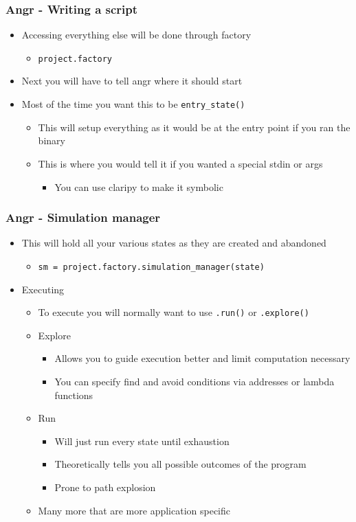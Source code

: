 \documentclass[aspectratio=169]{beamer}
\begin{document}
\begin{frame}[fragile]
\frametitle{Angr - Writing a script}
\begin{itemize}
\item Accessing everything else will be done through factory
\begin{itemize}
\item \verb|project.factory|
\end{itemize}
\item Next you will have to tell angr where it should start
\item Most of the time you want this to be \verb|entry_state()|
\begin{itemize}
\item This will setup everything as it would be at the entry point if you ran the binary
\item This is where you would tell it if you wanted a special stdin or args
\begin{itemize}
\item You can use claripy to make it symbolic
\end{itemize}
\end{itemize}
\end{itemize}
\end{frame}

\begin{frame}[fragile]
\frametitle{Angr - Simulation manager}
\begin{itemize}
\item This will hold all your various states as they are created and abandoned
\begin{itemize}
\item \verb|sm = project.factory.simulation_manager(state)|
\end{itemize}
\item Executing
\begin{itemize}
\item To execute you will normally want to use \verb|.run()| or \verb|.explore()|
\item Explore
\begin{itemize}
\item Allows you to guide execution better and limit computation necessary
\item You can specify find and avoid conditions via addresses or lambda functions
\end{itemize}
\item Run
\begin{itemize}
\item Will just run every state until exhaustion
\item Theoretically tells you all possible outcomes of the program
\item Prone to path explosion
\end{itemize}
\item Many more that are more application specific
\end{itemize}
\end{itemize}
\end{frame}
\end{document}
